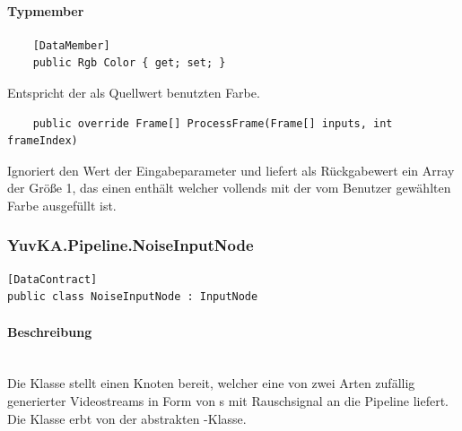\paragraph{Typmember}
\begin{itemize}

	\begin{verbatim}
	[DataMember]
	public Rgb Color { get; set; }
	\end{verbatim}
	Entspricht der als Quellwert benutzten Farbe.


	\begin{verbatim}
	public override Frame[] ProcessFrame(Frame[] inputs, int frameIndex)
	\end{verbatim}
	Ignoriert den Wert der Eingabeparameter und liefert als Rückgabewert ein Array der Größe 1, das einen  enthält welcher vollends mit der vom Benutzer gewählten Farbe ausgefüllt ist.

\end{itemize}

\subsubsection{YuvKA.Pipeline.NoiseInputNode}

\begin{verbatim}
[DataContract]
public class NoiseInputNode : InputNode
\end{verbatim}

\paragraph{Beschreibung}~\\
Die Klasse  stellt einen Knoten bereit, welcher eine von zwei Arten zufällig generierter Videostreams in Form von s mit Rauschsignal an die Pipeline liefert. Die Klasse erbt von der abstrakten -Klasse.

